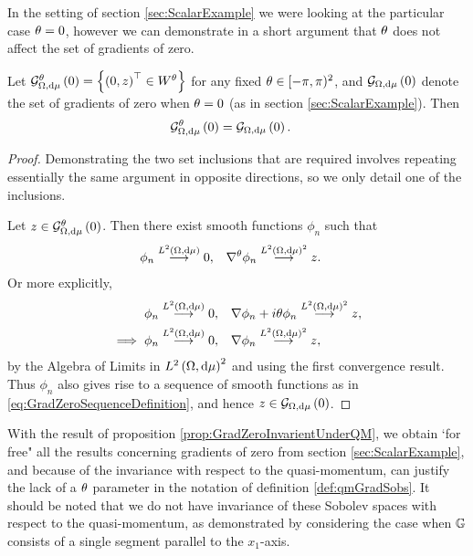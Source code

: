 In the setting of section \ref{sec:ScalarExample} we were looking at the particular case $\theta=0$, however we can demonstrate in a short argument that $\theta$ does not affect the set of gradients of zero.
\begin{prop} \label{prop:GradZeroInvarientUnderQM}
	Let $\mathcal{G}_{\Omega, \mathrm{d} \mu}^\theta\left( 0 \right) = \left\{ \left( 0,z \right)^\top \in W^\theta \right\}$ for any fixed $\theta\in[-\pi,\pi)^2$, and $\mathcal{G}_{ \Omega, \mathrm{d}\mu}\left( 0 \right)$ denote the set of gradients of zero when $\theta=0$ (as in section \ref{sec:ScalarExample}).
	Then
	\begin{align*}
		\mathcal{G}_{\Omega, \mathrm{d} \mu}^\theta\left( 0 \right) &= \mathcal{G}_{ \Omega, \mathrm{d}\mu}\left( 0 \right).
	\end{align*}
\end{prop}
\begin{proof}
	Demonstrating the two set inclusions that are required involves repeating essentially the same argument in opposite directions, so we only detail one of the inclusions. \newline
	
	Let $z\in\mathcal{G}_{\Omega, \mathrm{d} \mu}^\theta\left( 0 \right)$.
	Then there exist smooth functions $\phi_n$ such that
	\begin{align*}
		\phi_n \overset{L^{2}\left( \Omega,\mathrm{d}\mu \right)}{\longrightarrow}0, &\quad \nabla^\theta\phi_n\overset{L^{2}\left( \Omega,\mathrm{d}\mu \right)^2}{\longrightarrow}z.
	\end{align*}
	Or more explicitly,
	\begin{align*}
		\phi_n \overset{L^{2}\left( \Omega,\mathrm{d}\mu \right)}{\longrightarrow}0, &\quad \nabla\phi_n + i\theta\phi_n\overset{L^{2}\left( \Omega,\mathrm{d}\mu \right)^2}{\longrightarrow}z, \\
		\implies \phi_n \overset{L^{2}\left( \Omega,\mathrm{d}\mu \right)}{\longrightarrow}0, &\quad \nabla\phi_n \overset{L^{2}\left( \Omega,\mathrm{d}\mu \right)^2}{\longrightarrow}z,
	\end{align*}	
	by the Algebra of Limits in $L^{2}\left( \Omega,\mathrm{d}\mu \right)^2$ and using the first convergence result.
	Thus $\phi_n$ also gives rise to a sequence of smooth functions as in \eqref{eq:GradZeroSequenceDefinition}, and hence $z\in\mathcal{G}_{ \Omega, \mathrm{d}\mu}\left( 0 \right)$.
\end{proof}
With the result of proposition \ref{prop:GradZeroInvarientUnderQM}, we obtain `for free" all the results concerning gradients of zero from section \ref{sec:ScalarExample}, and because of the invariance with respect to the quasi-momentum, can justify the lack of a $\theta$ parameter in the notation of definition \ref{def:qmGradSobs}.
It should be noted that we do not have invariance of these Sobolev spaces with respect to the quasi-momentum, as demonstrated by considering the case when $\mathbb{G}$ consists of a single segment parallel to the $x_1$-axis.

